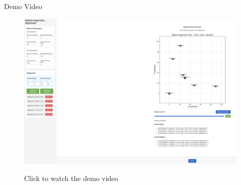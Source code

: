 \documentclass[11pt,xcolor={dvipsnames},hyperref={pdftex,pdfpagemode=UseNone,hidelinks,pdfdisplaydoctitle=true},usepdftitle=false]{beamer}
\begin{document}
  
    \begin{frame}{Demo Video}
    \centering
    \begin{figure}
      \centering
      \href{https://www.youtube-nocookie.com/embed/rC7g-lJ-lPA?playlist=rC7g-lJ-lPA&autoplay=1&iv_load_policy=3&loop=1&start=}{
        \includegraphics[width=0.7\linewidth]{figures/insp.pdf}
      }
      \caption{Click to watch the demo video}
    \end{figure}
  \end{frame}
    
    \lastslide
\end{document}
